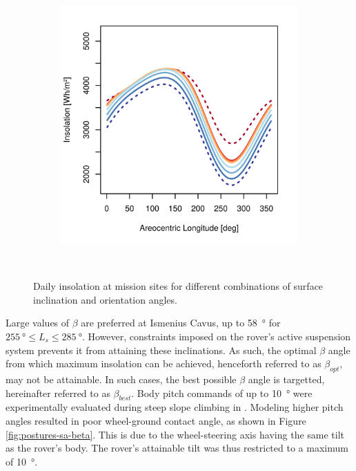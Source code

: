 \begin{figure}[h]
\begin{subfigure}[t]{\subfigureWidth}
            \includegraphics[height=\graphicsHeight]{sections/mars-solar-energy/mission-sites/plots/ismenius-cavus-solar-insolations-for-different-beta-inclinations.png}
            \label{fig:plot:sub:solar-insolations-for-different-beta-ismenius-cavus}
    \end{subfigure}\\[0.8ex]
    \caption[Daily insolation at mission sites for different combinations of surface inclination and orientation angles]
    {Daily insolation at mission sites for different combinations of surface inclination and orientation angles.}
    \label{fig:plot:solar-insolations-for-different-beta}
\vspace{-2ex}
\end{figure}

Large values of $\beta$ are preferred at Ismenius Cavus, up to \SI{58}{\degree} for $\SI{255}{\degree} \leq L_{s} \leq \SI{285}{\degree}$. However, constraints imposed on the rover's active suspension system prevents it from attaining these inclinations. As such, the optimal $\beta$ angle from which maximum insolation can be achieved, henceforth referred to as $\beta_{opt}$, may not be attainable. In such cases, the best possible $\beta$ angle is targetted, hereinafter referred to as $\beta_{best}$. Body pitch commands of up to \SI{10}{\degree} were experimentally evaluated during steep slope climbing in . Modeling higher pitch angles resulted in poor wheel-ground contact angle, as shown in Figure \ref{fig:postures-sa-beta}. This is due to the wheel-steering axis having the same tilt as the rover's body. The rover's attainable tilt was thus restricted to a maximum of \SI{10}{\degree}.


